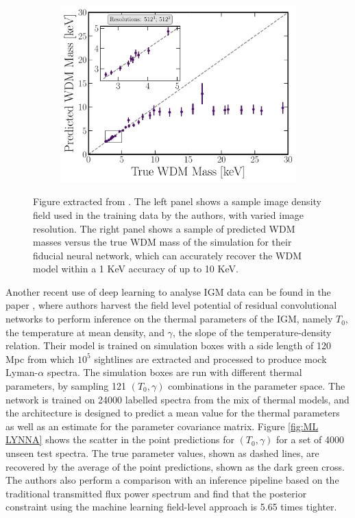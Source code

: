 \begin{figure}
\begin{subfigure}[b]{0.53\textwidth}
    \end{subfigure}
    \hfill
    \begin{subfigure}[b]{0.45\textwidth}
        \centering
        \includegraphics[width=1\textwidth]{img/ML/results_fixed_sim512_res512_z0.pdf}     
    \end{subfigure}
        \caption{Figure extracted from \cite{wdm_from_field}. The left panel shows a sample image density field used in the training data by the authors, with varied image resolution. The right panel shows a sample of predicted WDM masses versus the true WDM mass of the simulation for their fiducial neural network, which can accurately recover the WDM model within a 1 KeV accuracy of up to 10 KeV.}
        \label{fig:ML paper wdm field}
\end{figure}

Another recent use of deep learning to analyse IGM data can be found in the paper  \cite{lynna}, where authors harvest the field level potential of residual convolutional networks to perform inference on the thermal parameters of the IGM, namely $T_0$, the temperature at mean density, and $\gamma$, the slope of the temperature-density relation. Their model is trained on simulation boxes with a side length of 120 Mpc from which $10^5$ sightlines are extracted and processed to produce mock Lyman-$\alpha$ spectra. The simulation boxes are run with different thermal parameters, by sampling 121 $(T_0,\gamma)$ combinations in the parameter space. The network is trained on 24000 labelled spectra from the mix of thermal models, and the architecture is designed to predict a mean value for the thermal parameters as well as an estimate for the parameter covariance matrix. Figure \ref{fig:ML LYNNA} shows the scatter in the point predictions for $(T_0,\gamma)$ for a set of 4000 unseen test spectra. The true parameter values, shown as dashed lines, are recovered by the average of the point predictions, shown as the dark green cross. The authors also perform a comparison with an inference pipeline based on the traditional transmitted flux power spectrum and find that the posterior constraint using the machine learning field-level approach is 5.65 times tighter.

